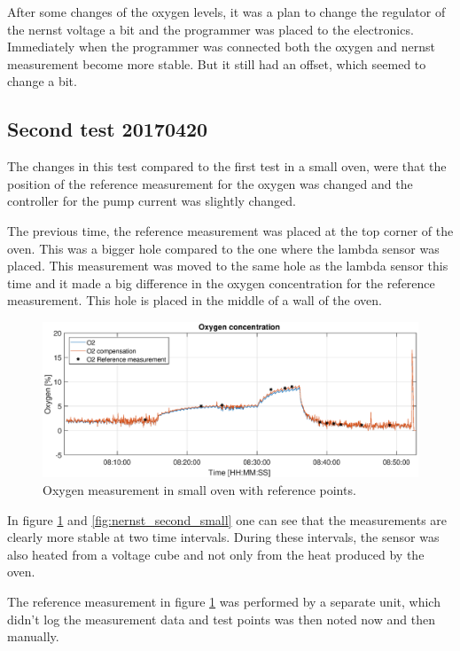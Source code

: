 After some changes of the oxygen levels, it was a plan to change the regulator of the nernst voltage a bit and the programmer was placed to the electronics. Immediately when the programmer was connected both the oxygen and nernst measurement become more stable. But it still had an offset, which seemed to change a bit.




\subsection{Second test 20170420}

The changes in this test compared to the first test in a small oven, were that the position of the reference measurement for the oxygen was changed and the controller for the pump current was slightly changed.

The previous time, the reference measurement was placed at the top corner of the oven. This was a bigger hole compared to the one where the lambda sensor was placed. This measurement was moved to the same hole as the lambda sensor this time and it made a big difference in the oxygen concentration for the reference measurement. This hole is placed in the middle of a wall of the oven.

\begin{figure}
    \centering
    \includegraphics[width = \textwidth]{Chapter4/Figures/oxygen_second_small.eps}
    \caption{Oxygen measurement in small oven with reference points.}
    \label{fig:oxygen_second_small}
\end{figure}

In figure \ref{fig:oxygen_second_small} and \ref{fig:nernst_second_small} one can see that the measurements are clearly more stable at two time intervals. During these intervals, the sensor was also heated from a voltage cube and not only from the heat produced by the oven.

The reference measurement in figure \ref{fig:oxygen_second_small} was performed by a separate unit, which didn't log the measurement data and test points was then noted now and then manually.

